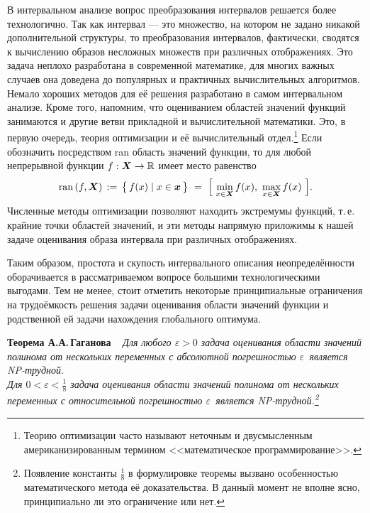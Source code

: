 \documentclass[a5paper,openany]{book}
\newcommand{\mbf}[1]{\protect\text{\boldmath$#1$}}
\newcommand{\mbb}{\mathbb}
\newcommand{\ran}{\mathrm{ran}\,}
\begin{document}
В интервальном анализе вопрос преобразования интервалов решается более технологично. 
Так как интервал --- это множество, на котором не задано никакой дополнительной 
структуры, то преобразования интервалов, фактически, сводятся к вычислению образов 
несложных множеств при различных отображениях. Это задача неплохо разработана 
в современной математике, для многих важных случаев она доведена до популярных и 
практичных  вычислительных алгоритмов. Немало хороших методов для её решения разработано 
в самом интервальном анализе. Кроме того, напомним, что оцениванием областей значений 
функций занимаются и другие ветви прикладной и вычислительной математики. Это, в первую 
очередь, теория оптимизации и её вычислительный отдел.\footnote{Теорию оптимизации 
часто называют неточным и двусмысленным американизированным термином <<математическое 
программирование>>.} Если обозначить посредством ran область значений функции, то 
для любой непрерывной функции $f:\mbf{X}\to\mbb{R}$ имеет место равенство 
\begin{equation*}
\ran(f,\mbf{X})\, := \, \bigl\{\, f(x) \mid x\in\mbf{x}\,\bigr\} \ 
= \  \Bigl[ \  \min_{x\in\mbf{X}} f(x) , \ 
                                  \max_{x\in\mbf{X}} f(x) \  \Bigr]. 
\end{equation*}
Численные методы оптимизации позволяют находить экстремумы функций, т.\,е. крайние 
точки областей значений, и эти методы напрямую приложимы к нашей задаче оценивания 
образа интервала при различных отображениях. 
  
Таким образом, простота и скупость интервального описания неопределённости 
оборачивается в рассматриваемом вопросе большими технологическими выгодами. Тем 
не менее, стоит отметить некоторые принципиальные ограничения на трудоёмкость 
решения задачи оценивания области значений функции и родственной ей задачи 
нахождения глобального оптимума. 
  
\bigskip\noindent  
\textbf{Теорема А.А.\,Гаганова} \cite{Gaganov} \   
{\sl Для любого $\varepsilon > 0$ задача оценивания области значений полинома 
от нескольких переменных с абсолютной погрешностью $\varepsilon\,$ является 
NP-трудной.\\ 
Для $0 <\varepsilon < \tfrac{1}{8}$ задача оценивания области значений полинома 
от нескольких переменных с относительной погрешностью $\varepsilon\,$ является 
NP-трудной.\footnote{Появление константы $\tfrac{1}{8}$ в формулировке теоремы 
вызвано особенностью математического метода её доказательства. В данный момент 
не вполне ясно, принципиально ли это ограничение или нет.}} 
   
\end{document}
